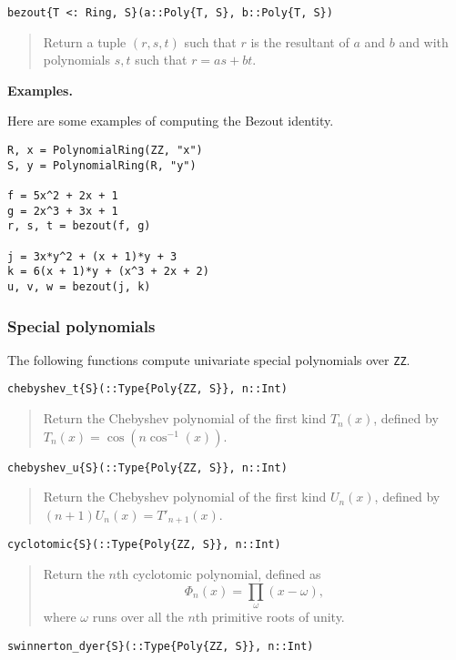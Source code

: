 \documentclass[a4paper,10pt]{article}
\newcommand{\code}{\lstinline}
\newcommand{\desc}[1]{\vspace{-3mm}\begin{quote}#1\end{quote}}
\begin{document}
{{{\begin{lstlisting}
bezout{T <: Ring, S}(a::Poly{T, S}, b::Poly{T, S})
\end{lstlisting}

\desc{Return a tuple $(r, s, t)$ such that $r$ is the resultant of $a$ and $b$
and with polynomials $s, t$ such that $r = as + bt$.}

\textbf{Examples.}

Here are some examples of computing the Bezout identity.

\begin{lstlisting}
R, x = PolynomialRing(ZZ, "x")
S, y = PolynomialRing(R, "y")

f = 5x^2 + 2x + 1
g = 2x^3 + 3x + 1
r, s, t = bezout(f, g)

j = 3x*y^2 + (x + 1)*y + 3
k = 6(x + 1)*y + (x^3 + 2x + 2)
u, v, w = bezout(j, k)
\end{lstlisting}

\subsubsection{Special polynomials}

The following functions compute univariate special polynomials over \code{ZZ}.

\begin{lstlisting}
chebyshev_t{S}(::Type{Poly{ZZ, S}}, n::Int)
\end{lstlisting}

\desc{Return the Chebyshev polynomial of the first kind $T_n(x)$, defined by 
$T_n(x) = \cos(n \cos^{-1}(x))$.}

\begin{lstlisting}
chebyshev_u{S}(::Type{Poly{ZZ, S}}, n::Int)
\end{lstlisting}

\desc{Return the Chebyshev polynomial of the first kind $U_n(x)$, defined by 
$(n+1) U_n(x) = T'_{n+1}(x)$.}

\begin{lstlisting}
cyclotomic{S}(::Type{Poly{ZZ, S}}, n::Int)
\end{lstlisting}

\desc{Return the $n$th cyclotomic polynomial, defined as
$$\Phi_n(x) = \prod_{\omega} (x-\omega),$$ where $\omega$ runs over all the 
$n$th primitive roots of unity.}

\begin{lstlisting}
swinnerton_dyer{S}(::Type{Poly{ZZ, S}}, n::Int)
\end{lstlisting}

}}}
\end{document}
